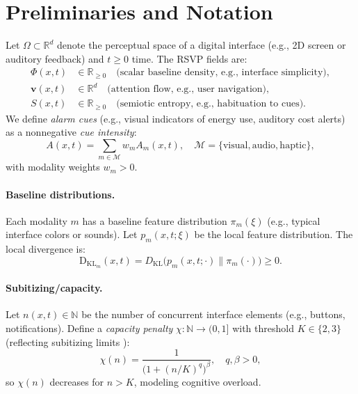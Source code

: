 \documentclass[openany]{book}
\newcommand{\PhiS}{\Phi} %
\newcommand{\vvec}{\mathbf{v}} %
\newcommand{\Sent}{S} %
\newcommand{\KL}{\mathrm{D}_{\mathrm{KL}}}
\begin{document}
\section{Preliminaries and Notation}
\label{sec:rsvp-prelim}
Let $\Omega \subset \mathbb{R}^d$ denote the perceptual space of a digital interface (e.g., 2D screen or auditory feedback) and $t \geq 0$ time. The RSVP fields are:
\begin{align*}
\PhiS(x,t) &\in \mathbb{R}_{\geq 0} \quad \text{(scalar baseline density, e.g., interface simplicity)}, \\
\vvec(x,t) &\in \mathbb{R}^d \quad \text{(attention flow, e.g., user navigation)}, \\
\Sent(x,t) &\in \mathbb{R}_{\geq 0} \quad \text{(semiotic entropy, e.g., habituation to cues)}.
\end{align*}
We define \emph{alarm cues} (e.g., visual indicators of energy use, auditory cost alerts) as a nonnegative \emph{cue intensity}:
\begin{equation}
A(x,t) = \sum_{m \in \mathcal{M}} w_m A_m(x,t), \quad \mathcal{M} = \{\text{visual}, \text{audio}, \text{haptic}\},
\end{equation}
with modality weights $w_m > 0$.

\paragraph{Baseline distributions.}
Each modality $m$ has a baseline feature distribution $\pi_m(\xi)$ (e.g., typical interface colors or sounds). Let $p_m(x,t;\xi)$ be the local feature distribution. The local divergence is:
\begin{equation}
\label{eq:KL}
\KL_m(x,t) = D_{\mathrm{KL}}\big(p_m(x,t;\cdot) \|\pi_m(\cdot)\big) \geq 0.
\end{equation}

\paragraph{Subitizing/capacity.}
Let $n(x,t) \in \mathbb{N}$ be the number of concurrent interface elements (e.g., buttons, notifications). Define a \emph{capacity penalty} $\chi: \mathbb{N} \to (0,1]$ with threshold $K \in \{2,3\}$ (reflecting subitizing limits \citep{kaufman1949}):
\begin{equation}
\label{eq:capacity}
\chi(n) = \frac{1}{\big(1 + (n/K)^q\big)^{\beta}}, \quad q, \beta > 0,
\end{equation}
so $\chi(n)$ decreases for $n > K$, modeling cognitive overload.
\end{document}
